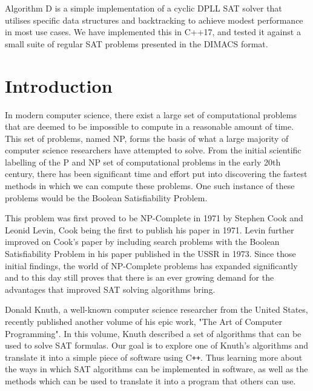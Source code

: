 \documentclass{article}
\begin{document}
Algorithm D is a simple implementation of a cyclic DPLL SAT solver that utilises specific data structures and backtracking to achieve
modest performance in most use cases. We have implemented this in C++17, and tested it against a small suite of regular SAT problems
presented in the DIMACS format.

\newpage

\thispagestyle{empty}
\tableofcontents

\newpage

\section{Introduction}
In modern computer science, there exist a large set of computational problems that are deemed to be impossible to compute in a reasonable
amount of time. This set of problems, named NP, forms the basis of what a large majority of computer science researchers have attempted to
solve. From the initial scientific labelling of the P and NP set of computational problems in the early 20th century\cite{pvsnp}, there has been
significant time and effort put into discovering the fastest methods in which we can compute these problems. One such instance of these
problems would be the Boolean Satisfiability Problem.

This problem was first proved to be NP-Complete in 1971 by Stephen Cook and Leonid Levin, Cook being the first to publish his paper in
1971\cite{scook}. Levin further improved on Cook's paper by including search problems with the Boolean Satisfiability Problem in his paper published
in the USSR in 1973\cite{levin}. Since those initial findings, the world of NP-Complete problems has expanded significantly and to this day still
proves that there is an ever growing demand for the advantages that improved SAT solving algorithms bring.

Donald Knuth, a well-known computer science researcher from the United States, recently published another volume of his epic work, "The Art
of Computer Programming". In this volume, Knuth described a set of algorithms that can be used to solve SAT formulas. Our goal is to
explore one of Knuth's algorithms and translate it into a simple piece of software using C\texttt{++}. Thus learning more about the ways in which
SAT algorithms can be implemented in software, as well as the methods which can be used to translate it into a program that others can use.
\end{document}
